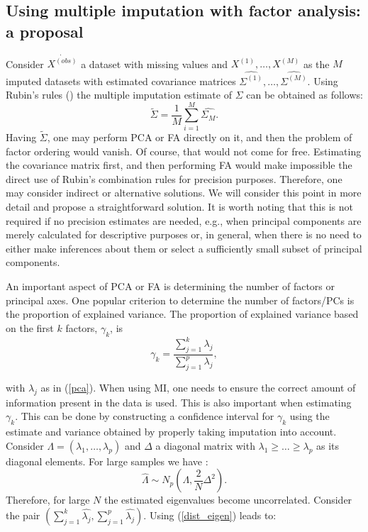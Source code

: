 \documentclass[11pt,a5paper,twoside]{book}
\begin{document}
\subsection{Using multiple imputation with factor analysis: a proposal}
\label{sec_new_approach}
Consider $\dot{X^{(obs)}}$ a dataset with missing values and $X^{(1)},\ldots,X^{(M)}$ as the $M$ imputed datasets with estimated covariance matrices $\widehat{\Sigma^{(1)}},\ldots,\widehat{\Sigma^{(M)}}$. Using Rubin's rules (\cite{rubin2004}) the multiple imputation estimate of $\Sigma$ can be obtained as follows:
\begin{equation}
\label{mi_sigma}
\widetilde{\Sigma}= \frac{1}{M}\sum_{i=1}^M \widehat{\Sigma_M}.
\end{equation}
Having $\widetilde{\Sigma}$, one may perform PCA or FA directly on it, and then the problem of factor ordering would vanish. Of course, that would not come for free. Estimating the covariance matrix first, and then performing FA would make impossible the direct use of Rubin's combination rules for precision purposes. Therefore, one may consider indirect or alternative solutions. We will consider this point in more detail and propose a straightforward solution. It is worth noting that this is not required if no precision estimates are needed, e.g., when principal components are merely calculated for descriptive purposes or, in general, when there is no need to either make inferences about them or select a sufficiently small subset of principal components. 


An important aspect of PCA or FA is determining the number of factors or principal axes. One popular criterion to determine the number of factors/PCs is the proportion of explained variance. The proportion of explained variance based on the first $k$ factors, $\gamma_k$, is
\begin{equation}
\label{prop_variance}
\gamma_k = \frac{\sum_{j=1}^k \lambda_j}{\sum_{j=1}^p \lambda_j},
\end{equation}

with $\lambda_j$ as in (\ref{pca}). When using MI, one needs to ensure the correct amount of information present in the data is used. This is also important when estimating $\gamma_k$. This can be done by constructing a confidence interval for $\gamma_k$ using the estimate and variance obtained by properly taking imputation into account. Consider $\Lambda=(\lambda_1,\ldots,\lambda_p)$ and $\Delta$ a diagonal matrix with $\lambda_1 \geq \ldots\geq \lambda_p$ as its diagonal elements. For large samples we have \citep{anderson1963,johnson1992,larsen2010}:
\begin{equation}
\label{dist_eigen}
\widehat{\Lambda}\sim N_p \left(\Lambda, \frac{2}{N}\Delta^2\right).
\end{equation}
Therefore, for large $N$ the estimated eigenvalues become uncorrelated. Consider the pair $(\sum_{j=1}^k \widehat{\lambda_j},\sum_{j=1}^p \widehat{\lambda_j})$. Using (\ref{dist_eigen}) leads to:
\end{document}
